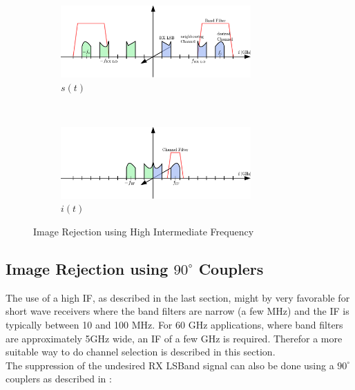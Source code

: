 \begin{figure}[p]
  \centering
  \begin{subfigure}{\textwidth}
    \centering
    \includegraphics[width=0.8\textwidth]{figures/rx_rf_0_freq_s}
    \caption{$s(t)$}
    \label{fig:rx_rf_0_freq_s}
  \end{subfigure}
  \vspace{4ex} \\
  \begin{subfigure}{\textwidth}
    \centering
    \includegraphics[width=0.8\textwidth]{figures/rx_rf_0_freq_i}
    \caption{$i(t)$}
    \label{fig:rx_rf_0_freq_i}
  \end{subfigure}
  \caption{Image Rejection using High Intermediate Frequency}
  \label{fig:rx_rf_0_freq}
\end{figure}

\subsection{Image Rejection using $90^\circ$ Couplers}
\label{sec:rx_rf_1}
The use of a high \gls{IF}, as described in the last section, might
by very favorable for short wave receivers where the band filters
are narrow (a few MHz) and the \gls{IF} is typically between 10 and 100 MHz.
For 60 GHz applications, where band filters are approximately 5GHz wide,
an \gls{IF} of a few GHz is required.
Therefor a more suitable way to do channel selection is described in this
section. \\

The suppression of the undesired \gls{RX} \gls{LSBand} signal can also be done
using a $90^\circ$ couplers as described in : \\

